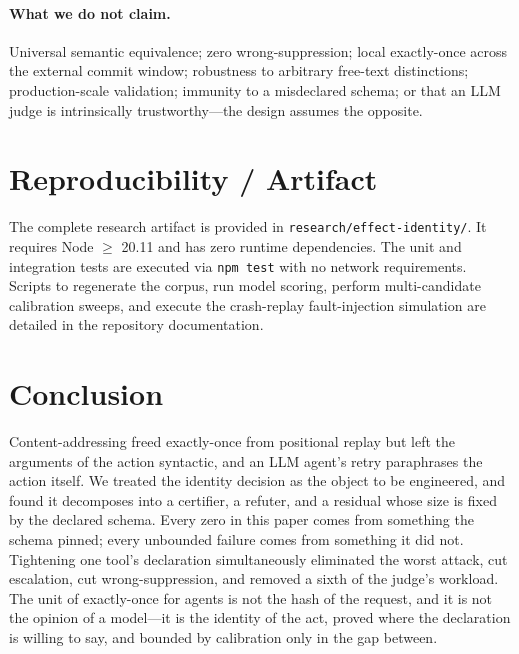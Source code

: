 \documentclass[10pt,twocolumn]{article}
\theoremstyle{definition}
\theoremstyle{remark}
\begin{document}
\paragraph{What we do not claim.} Universal semantic equivalence; zero
wrong-suppression; local exactly-once across the external commit window;
robustness to arbitrary free-text distinctions; production-scale validation;
immunity to a misdeclared schema; or that an LLM judge is intrinsically
trustworthy---the design assumes the opposite.

\section{Reproducibility / Artifact}

The complete research artifact is provided in \texttt{research/effect-identity/}. It requires Node $\ge$ 20.11 and has zero runtime dependencies. The unit and integration tests are executed via \texttt{npm test} with no network requirements. Scripts to regenerate the corpus, run model scoring, perform multi-candidate calibration sweeps, and execute the crash-replay fault-injection simulation are detailed in the repository documentation.

\section{Conclusion}

Content-addressing freed exactly-once from positional replay but left the
arguments of the action syntactic, and an LLM agent's retry paraphrases the
action itself. We treated the identity decision as the object to be engineered,
and found it decomposes into a certifier, a refuter, and a residual whose size is
fixed by the declared schema. Every zero in this paper comes from something the
schema pinned; every unbounded failure comes from something it did not.
Tightening one tool's declaration simultaneously eliminated the worst attack, cut
escalation, cut wrong-suppression, and removed a sixth of the judge's workload.
The unit of exactly-once for agents is not the hash of the request, and it is not
the opinion of a model---it is the identity of the act, proved where the
declaration is willing to say, and bounded by calibration only in the gap
between.

\balance


\end{document}
